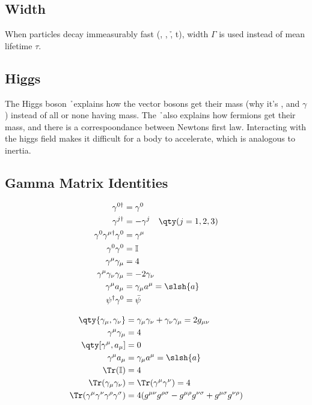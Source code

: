 \subsection{Width}
When particles decay immeasurably fast (\W, \Z, \h, t), width $\Gamma$ is used instead of mean lifetime $\tau$. 
\subsection{Higgs}
The Higgs boson \h\ explains how the vector bosons get their mass (why it's \W, \Z and $\gamma$) instead of all or none having mass. 
The \h\ also explains how fermions get their mass, and there is a correspoondance between Newtons first law. Interacting with the higgs field makes it difficult for a body to accelerate, which is analogous to inertia.
\subsection{Gamma Matrix Identities}
	\begin{minipage}{0.45\textwidth}
		\begin{align*}
			\gamma^{0\dagger}&=\gamma^0
			\\
			\gamma^{j\dagger}&=-\gamma^j\quad\qty(j=1,2,3)
			\\
			\gamma^0\gamma^{\mu\dagger}\gamma^0&=\gamma^\mu
			\\
			\gamma^{0}\gamma^{0}&=\mathbb{I}
			\\
			\gamma^\mu\gamma_\mu&=4
			\\
			\gamma^\mu\gamma_\nu\gamma_\mu&=-2\gamma_\nu
			\\
			\gamma^\mu a_\mu&=\gamma_\mu a^\mu=\slsh{a}
			\\
			\psi^\dagger\gamma^0&=\bar{\psi}
		\end{align*}
	\end{minipage}
	\begin{minipage}{0.48\textwidth}
		\begin{align*}
			\qty{\gamma_\mu,\gamma_\nu}&=\gamma_\mu\gamma_\nu+\gamma_\nu\gamma_\mu=2g_{\mu\nu}
			\\
			\gamma^\mu\gamma_\mu&=4
			\\
			\qty[\gamma^\mu,a_\mu]&=0
			\\
			\gamma^\mu a_\mu&=\gamma_\mu a^\mu=\slsh{a}
			\\
			\Tr(\mathbb{I})&=4
			\\
			\Tr(\gamma_\mu\gamma_\nu)&=\Tr(\gamma^\mu\gamma^\nu)=4
			\\
			\Tr(\gamma^\mu\gamma^\nu\gamma^\rho\gamma^\sigma)&=4(g^{\mu\nu}g^{\rho\sigma}-g^{\mu\rho}g^{\nu\sigma}+g^{\mu\sigma}g^{\nu\rho})
		\end{align*}
	\end{minipage}
